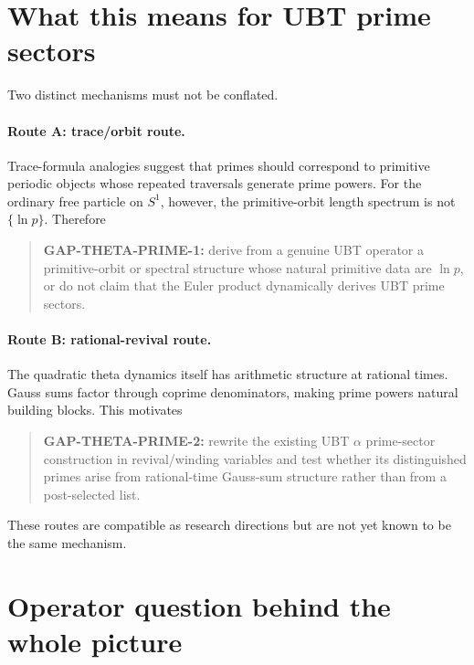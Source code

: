 \section{What this means for UBT prime sectors}

Two distinct mechanisms must not be conflated.

\paragraph{Route A: trace/orbit route.}
Trace-formula analogies suggest that primes should correspond to primitive periodic
objects whose repeated traversals generate prime powers.  For the ordinary free particle
on $S^1$, however, the primitive-orbit length spectrum is not $\{\ln p\}$.  Therefore
\begin{quote}
\textbf{GAP-THETA-PRIME-1:} derive from a genuine UBT operator a primitive-orbit or
spectral structure whose natural primitive data are $\ln p$, or do not claim that the
Euler product dynamically derives UBT prime sectors.
\end{quote}

\paragraph{Route B: rational-revival route.}
The quadratic theta dynamics itself has arithmetic structure at rational times.  Gauss
sums factor through coprime denominators, making prime powers natural building blocks.
This motivates
\begin{quote}
\textbf{GAP-THETA-PRIME-2:} rewrite the existing UBT $\alpha$ prime-sector construction
in revival/winding variables and test whether its distinguished primes arise from
rational-time Gauss-sum structure rather than from a post-selected list.
\end{quote}

These routes are compatible as research directions but are not yet known to be the same
mechanism.

\section{Operator question behind the whole picture}

